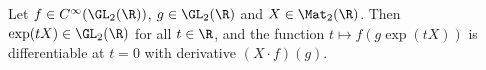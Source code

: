 Let $f\in C^\infty(\GL_2(\R))$, $g\in\GL_2(\R)$ and $X\in\Mat_2(\R)$. Then $\exp(tX)\in\GL_2(\R)$ for all
$t\in\R$, and the function $t\mapsto f(g\exp(tX))$ is differentiable at $t=0$ with derivative $(X\cdot f)(g)$.
